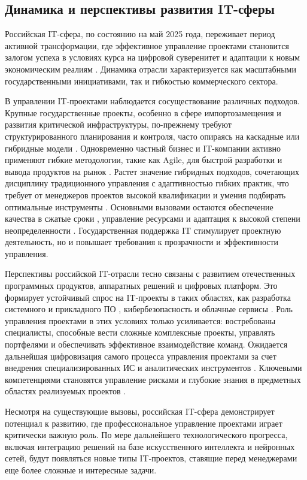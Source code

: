 \subsection{Динамика и перспективы развития IT-сферы}
Российская IT-сфера, по состоянию на май 2025 года, переживает период активной трансформации, где эффективное управление проектами становится залогом успеха в условиях курса на цифровой суверенитет и адаптации к новым экономическим реалиям \cite{management1}. Динамика отрасли характеризуется как масштабными государственными инициативами, так и гибкостью коммерческого сектора.

В управлении IT-проектами наблюдается сосуществование различных подходов. Крупные государственные проекты, особенно в сфере импортозамещения и развития критической инфраструктуры, по-прежнему требуют структурированного планирования и контроля, часто опираясь на каскадные или гибридные модели \cite{management2}. Одновременно частный бизнес и IT-компании активно применяют гибкие методологии, такие как Agile, для быстрой разработки и вывода продуктов на рынок \cite{agile4}. Растет значение гибридных подходов, сочетающих дисциплину традиционного управления с адаптивностью гибких практик, что требует от менеджеров проектов высокой квалификации и умения подбирать оптимальные инструменты \cite{management8}. Основными вызовами остаются обеспечение качества в сжатые сроки \cite{management4}, управление ресурсами и адаптация к высокой степени неопределенности \cite{management3}.
Государственная поддержка IT стимулирует проектную деятельность, но и повышает требования к прозрачности и эффективности управления.

Перспективы российской IT-отрасли тесно связаны с развитием отечественных программных продуктов, аппаратных решений и цифровых платформ. Это формирует устойчивый спрос на IT-проекты в таких областях, как разработка системного и прикладного ПО \cite{architecture1}, кибербезопасность и облачные сервисы \cite{management10}. Роль управления проектами в этих условиях только усиливается: востребованы специалисты, способные вести сложные комплексные проекты, управлять портфелями и обеспечивать эффективное взаимодействие команд.
Ожидается дальнейшая цифровизация самого процесса управления проектами за счет внедрения специализированных ИС и аналитических инструментов \cite{devops1}. Ключевыми компетенциями становятся управление рисками и глубокие знания в предметных областях реализуемых проектов \cite{management6}.

Несмотря на существующие вызовы, российская IT-сфера демонстрирует потенциал к развитию, где профессиональное управление проектами играет критически важную роль. По мере дальнейшего технологического прогресса, включая интеграцию решений на базе искусственного интеллекта и нейронных сетей, будут появляться новые типы IT-проектов, ставящие перед менеджерами еще более сложные и интересные задачи.